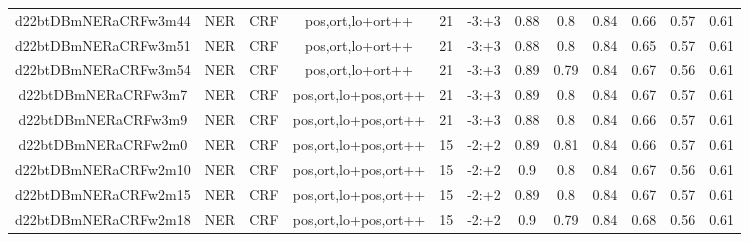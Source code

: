 \documentclass[a4paper]{article}
\begin{document}
\begin{landscape}
\begin{center}
\begin{tabular}{ |c|c|c|c|c|c|c|c|c|c|c|c|}
 	
 
 	
 		
 		\small{ d22btDBmNERaCRFw3m44 } & NER & CRF & pos,ort,lo+ort++  &  21 &  -3:+3  &  0.88 & 0.8 & 0.84  &  0.66 & 0.57 & 0.61 \\
 		

 	
 
 	
 		
 		\small{ d22btDBmNERaCRFw3m51 } & NER & CRF & pos,ort,lo+ort++  &  21 &  -3:+3  &  0.88 & 0.8 & 0.84  &  0.65 & 0.57 & 0.61 \\
 		

 	
 
 	
 		
 		\small{ d22btDBmNERaCRFw3m54 } & NER & CRF & pos,ort,lo+ort++  &  21 &  -3:+3  &  0.89 & 0.79 & 0.84  &  0.67 & 0.56 & 0.61 \\
 		

 	
 
 	
 		
 		\small{ d22btDBmNERaCRFw3m7 } & NER & CRF & pos,ort,lo+pos,ort++  &  21 &  -3:+3  &  0.89 & 0.8 & 0.84  &  0.67 & 0.57 & 0.61 \\
 		

 	
 
 	
 		
 		\small{ d22btDBmNERaCRFw3m9 } & NER & CRF & pos,ort,lo+pos,ort++  &  21 &  -3:+3  &  0.88 & 0.8 & 0.84  &  0.66 & 0.57 & 0.61 \\
 		

 	
 
 	
 		
 		\small{ d22btDBmNERaCRFw2m0 } & NER & CRF & pos,ort,lo+pos,ort++  &  15 &  -2:+2  &  0.89 & 0.81 & 0.84  &  0.66 & 0.57 & 0.61 \\
 		

 	
 
 	
 		
 		\small{ d22btDBmNERaCRFw2m10 } & NER & CRF & pos,ort,lo+pos,ort++  &  15 &  -2:+2  &  0.9 & 0.8 & 0.84  &  0.67 & 0.56 & 0.61 \\
 		

 	
 
 	
 		
 		\small{ d22btDBmNERaCRFw2m15 } & NER & CRF & pos,ort,lo+pos,ort++  &  15 &  -2:+2  &  0.89 & 0.8 & 0.84  &  0.67 & 0.57 & 0.61 \\
 		

 	
 
 	
 		
 		\small{ d22btDBmNERaCRFw2m18 } & NER & CRF & pos,ort,lo+pos,ort++  &  15 &  -2:+2  &  0.9 & 0.79 & 0.84  &  0.68 & 0.56 & 0.61 \\
 		


\end{tabular}
\end{center}
\end{landscape}
\end{document}
